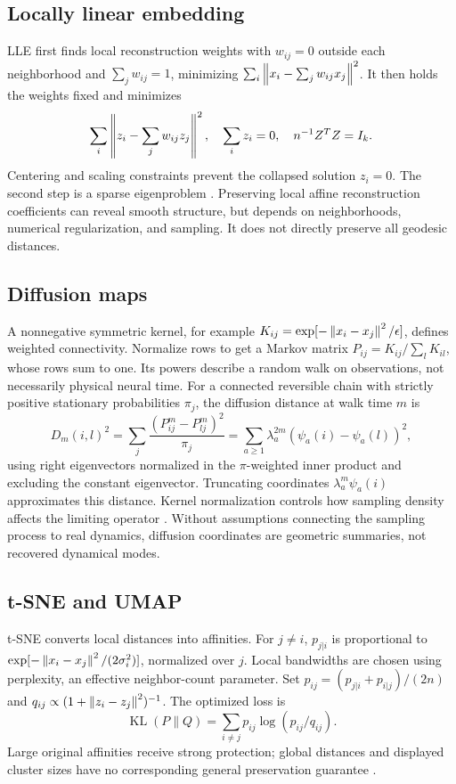 \subsection{Locally linear embedding}
LLE first finds local reconstruction weights with $w_{ij}=0$ outside each neighborhood and $\sum_jw_{ij}=1$, minimizing $\sum_i\left\lVert x_i-\sum_jw_{ij}x_j\right\rVert^2$. It then holds the weights fixed and minimizes
\begin{equation}
\sum_i\left\lVert z_i-\sum_jw_{ij}z_j\right\rVert^2,
\quad \sum_i z_i=0,\quad n^{-1}Z^TZ=I_k.
\end{equation}
Centering and scaling constraints prevent the collapsed solution $z_i=0$. The second step is a sparse eigenproblem \citep{roweis2000}. Preserving local affine reconstruction coefficients can reveal smooth structure, but depends on neighborhoods, numerical regularization, and sampling. It does not directly preserve all geodesic distances.

\subsection{Diffusion maps}
A nonnegative symmetric kernel, for example $K_{ij}=\exp[-\left\lVert x_i-x_j\right\rVert^2/\epsilon]$, defines weighted connectivity. Normalize rows to get a Markov matrix $P_{ij}=K_{ij}/\sum_lK_{il}$, whose rows sum to one. Its powers describe a random walk on observations, not necessarily physical neural time. For a connected reversible chain with strictly positive stationary probabilities $\pi_j$, the diffusion distance at walk time $m$ is
\begin{equation}
D_m(i,l)^2=\sum_j\frac{(P^m_{ij}-P^m_{lj})^2}{\pi_j}
=\sum_{a\geq1}\lambda_a^{2m}(\psi_a(i)-\psi_a(l))^2,
\end{equation}
using right eigenvectors normalized in the $\pi$-weighted inner product and excluding the constant eigenvector. Truncating coordinates $\lambda_a^m\psi_a(i)$ approximates this distance. Kernel normalization controls how sampling density affects the limiting operator \citep{coifman2006}. Without assumptions connecting the sampling process to real dynamics, diffusion coordinates are geometric summaries, not recovered dynamical modes.

\subsection{t-SNE and UMAP}
t-SNE converts local distances into affinities. For $j\ne i$, $p_{j|i}$ is proportional to $\exp[-\left\lVert x_i-x_j\right\rVert^2/(2\sigma_i^2)]$, normalized over $j$. Local bandwidths are chosen using perplexity, an effective neighbor-count parameter. Set $p_{ij}=(p_{j|i}+p_{i|j})/(2n)$ and $q_{ij}\propto(1+\left\lVert z_i-z_j\right\rVert^2)^{-1}$. The optimized loss is
\begin{equation}
\operatorname{KL}(P\|Q)=\sum_{i\ne j}p_{ij}\log(p_{ij}/q_{ij}).
\end{equation}
Large original affinities receive strong protection; global distances and displayed cluster sizes have no corresponding general preservation guarantee \citep{vandermaaten2008}.

